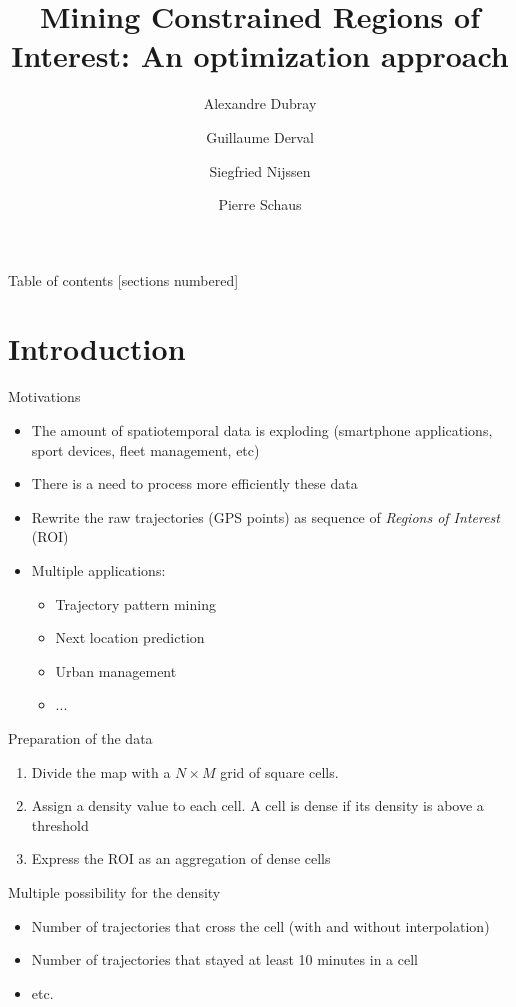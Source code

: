 \documentclass[10pt]{beamer}
\title{Mining Constrained Regions of Interest: An optimization approach}
\date{}
\author{Alexandre Dubray \and Guillaume Derval \and Siegfried Nijssen \and Pierre Schaus}
\institute{}
\begin{document}
\maketitle

\begin{frame}{Table of contents}
  [sections numbered]
  \tableofcontents%
\end{frame}

\section{Introduction}

\begin{frame}{Motivations}
\begin{itemize}
    \item The amount of spatiotemporal data is exploding (smartphone applications, sport devices, fleet management, etc)
    \item There is a need to process more efficiently these data
    \item Rewrite the raw trajectories (GPS points) as sequence of \emph{Regions of Interest} (ROI)
    \item Multiple applications:
        \begin{itemize}
            \item Trajectory pattern mining
            \item Next location prediction
            \item Urban management
            \item ...
        \end{itemize}
\end{itemize}
\end{frame}

\begin{frame}{Preparation of the data}
    \begin{enumerate}
        \item Divide the map with a $N \times M$ grid of square cells.
        \item Assign a density value to each cell. A cell is dense if its density is above a threshold
        \item Express the ROI as an aggregation of dense cells
    \end{enumerate}

    Multiple possibility for the density
    \begin{itemize}
        \item Number of trajectories that cross the cell (with and without interpolation)
        \item Number of trajectories that stayed at least 10 minutes in a cell
        \item etc.
    \end{itemize}
\end{frame}
\end{document}
